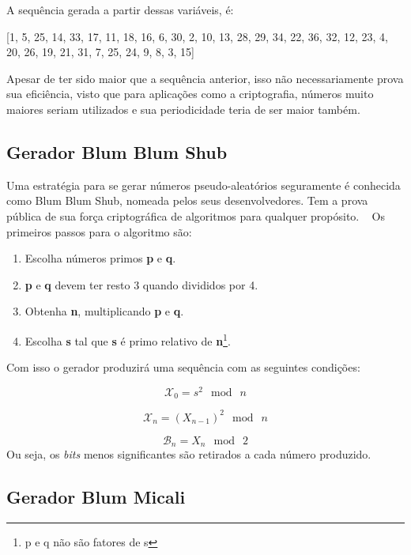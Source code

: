 A sequência gerada a partir dessas variáveis, é:

[1, 5, 25, 14, 33, 17, 11, 18, 16, 6, 30, 2, 10, 13, 28, 29, 34, 22, 36, 32, 12, 23, 4, 20, 26, 19, 21, 31, 7, 25, 24, 9, 8, 3, 15]

Apesar de ter sido maior que a sequência anterior, isso não necessariamente prova sua eficiência, visto que para aplicações como a criptografia, números muito maiores seriam utilizados e sua periodicidade teria de ser maior também.


\subsection{Gerador Blum Blum Shub}
Uma estratégia para se gerar números pseudo-aleatórios seguramente é conhecida como Blum Blum Shub, nomeada pelos seus desenvolvedores. Tem a prova pública de sua força criptográfica de algoritmos para qualquer propósito. ~\cite{william-stallings} Os primeiros passos para o algoritmo são:

\begin{enumerate}
	\item Escolha números primos \textbf{p} e \textbf{q}.
	\item \textbf{p} e \textbf{q} devem ter resto 3 quando divididos por 4.
	\item Obtenha \textbf{n}, multiplicando \textbf{p} e \textbf{q}.
	\item Escolha \textbf{s} tal que \textbf{s} é primo relativo de \textbf{n}\footnote{p e q não são fatores de s}.
\end{enumerate}

Com isso o gerador produzirá uma sequência com as seguintes condições:

\begin{equation}
	\label{Equação para produzir a sequência}
	\mathcal{X}_0 = s^2\: \bmod \: n
\end{equation}

\begin{equation}
	\label{Equação para produzir a sequência}
	\mathcal{X}_n = (X_{n-1})^2 \: \bmod \: n
\end{equation}

\begin{equation}
	\label{Equação para produzir a sequência}
	\mathcal{B}_n = X_n \: \bmod \: 2
\end{equation}
Ou seja, os \textit{bits} menos significantes são retirados a cada número produzido.

\subsection{Gerador Blum Micali}
\label{blum-micali-generator}

